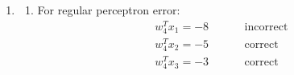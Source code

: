 \documentclass[11pt]{article}
\begin{document}
{\begin{enumerate}
\begin{enumerate}
\[                    .\] 
                \item For voted perceptron
                    \[
                        \hat y = \text{sign}[2\text{sign}(\begin{pmatrix} 4 \\ 0 \end{pmatrix}^{T}x) + 2\text{sign}(\begin{pmatrix} 3 \\ -1 \end{pmatrix}^{T}x) + 4\text{sign}(\begin{pmatrix} 1 \\ -3 \end{pmatrix}^{T}x) + \text{sign}(\begin{pmatrix} -2 \\ -3 \end{pmatrix}^{T}x)]
                    .\] 
                \item For average perceptron
                    \[
                        \hat y = \text{sign}[2(\begin{pmatrix} 4 \\ 0 \end{pmatrix}^{T}x) + 2(\begin{pmatrix} 3 \\ -1 \end{pmatrix}^{T}x) + (\begin{pmatrix} 1 \\ -3 \end{pmatrix}^{T}x) + (\begin{pmatrix} -2 \\ -3 \end{pmatrix}^{T}x)]
                    .\] 
            \end{enumerate}
        \item 
            \begin{enumerate}
                \item For regular perceptron error:\\
                    \begin{align*}
                        w_4^{T}x_1 = -8 &\hspace{1cm} \text{incorrect}\\
                        w_4^{T}x_2 = -5 &\hspace{1cm} \text{correct}\\
                        w_4^{T}x_3 = -3 &\hspace{1cm} \text{correct}\\

\end{align*}
\end{enumerate}
\end{enumerate}}
\end{document}
